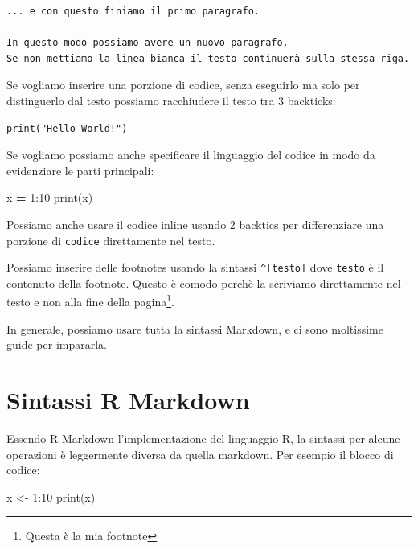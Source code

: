 \documentclass[
]{article}
\newenvironment{Shaded}{\begin{snugshade}}{\end{snugshade}}
\newcommand{\BuiltInTok}[1]{#1}
\newcommand{\DecValTok}[1]{\textcolor[rgb]{0.00,0.00,0.81}{#1}}
\newcommand{\FunctionTok}[1]{\textcolor[rgb]{0.00,0.00,0.00}{#1}}
\newcommand{\NormalTok}[1]{#1}
\newcommand{\OperatorTok}[1]{\textcolor[rgb]{0.81,0.36,0.00}{\textbf{#1}}}
\newcommand{\OtherTok}[1]{\textcolor[rgb]{0.56,0.35,0.01}{#1}}
\newcommand{\SpecialCharTok}[1]{\textcolor[rgb]{0.00,0.00,0.00}{#1}}
\begin{document}
\begin{verbatim}
... e con questo finiamo il primo paragrafo.

In questo modo possiamo avere un nuovo paragrafo. 
Se non mettiamo la linea bianca il testo continuerà sulla stessa riga.
\end{verbatim}

Se vogliamo inserire una porzione di codice, senza eseguirlo ma solo per distinguerlo dal testo possiamo racchiudere il testo tra 3 backticks:

\begin{verbatim}
print("Hello World!")
\end{verbatim}

Se vogliamo possiamo anche specificare il linguaggio del codice in modo da evidenziare le parti principali:

\begin{Shaded}
\begin{Highlighting}[]
\NormalTok{x }\OperatorTok{=} \DecValTok{1}\NormalTok{:}\DecValTok{10}
\BuiltInTok{print}\NormalTok{(x)}
\end{Highlighting}
\end{Shaded}

Possiamo anche usare il codice inline usando 2 backtics per differenziare una porzione di \texttt{codice} direttamente nel testo.

Possiamo inserire delle footnotes usando la sintassi \texttt{\^{}{[}testo{]}} dove \texttt{testo} è il contenuto della footnote. Questo è comodo perchè la scriviamo direttamente nel testo e non alla fine della pagina\footnote{Questa è la mia footnote}.

In generale, possiamo usare tutta la sintassi Markdown, e ci sono moltissime guide per impararla.

\hypertarget{sintassi-r-markdown}{%
\section{Sintassi R Markdown}\label{sintassi-r-markdown}}

Essendo R Markdown l'implementazione del linguaggio R, la sintassi per alcune operazioni è leggermente diversa da quella markdown. Per esempio il blocco di codice:

\begin{Shaded}
\begin{Highlighting}[]
\NormalTok{x }\OtherTok{\textless{}{-}} \DecValTok{1}\SpecialCharTok{:}\DecValTok{10}
\FunctionTok{print}\NormalTok{(x)}
\end{Highlighting}
\end{Shaded}
\end{document}

